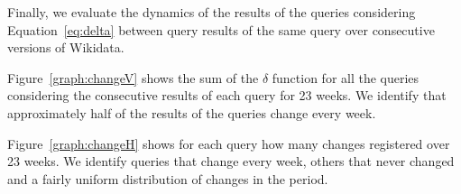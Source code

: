 \documentclass[runningheads]{llncs}
\begin{document}
\begin{table}[h]
	\centering
	\caption{Structure of navigational Property Paths.}
	\label{tab:Path}
\end{table}

Finally, we evaluate the dynamics of the results of the queries considering Equation~\ref{eq:delta} between query results of the same query over consecutive versions of Wikidata.

Figure~\ref{graph:changeV} shows the sum of the $ \delta $ function for all the queries considering the consecutive results of each query for 23 weeks. We identify that approximately half of the results of the queries change every week.

Figure~\ref{graph:changeH} shows for each query how many changes registered over 23 weeks. We identify queries that change every week, others that never changed and a fairly uniform distribution of changes in the period.
\end{document}
